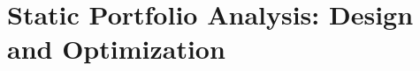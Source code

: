%
%
%
%

\chapter{Static Portfolio Analysis: Design and Optimization}
\label{ch:static-portfolio-analysis}

